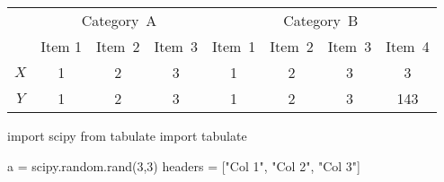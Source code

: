 \begin{tabular}{c@{\qquad}ccc@{\qquad}cccc}
	\toprule
	\multirow{2}{*}{\raisebox{-\heavyrulewidth}{Title}} & \multicolumn{3}{c}{Category~A} & \multicolumn{4}{c}{Category~B} \\
	\cmidrule{2-8}
	& Item 1 & Item~2 & Item~3 & Item~1 & Item~2 & Item~3 & Item~4 \\
	\midrule
	$X$ & 1 & 2 & 3 & 1 & 2 & 3 & 3 \\
	$Y$ & 1 & 2 & 3 & 1 & 2 & 3 & 143 \\
	\bottomrule
\end{tabular}

\begin{pycode} 
	import scipy
	from tabulate import tabulate
	
	a = scipy.random.rand(3,3)
	headers = ["Col 1", "Col 2", "Col 3"]
\end{pycode}

\begin{table}[H]
\begin{center}
\end{center}
\end{table}
	
\begin{table}[H]
\centering
{}
\end{table}

